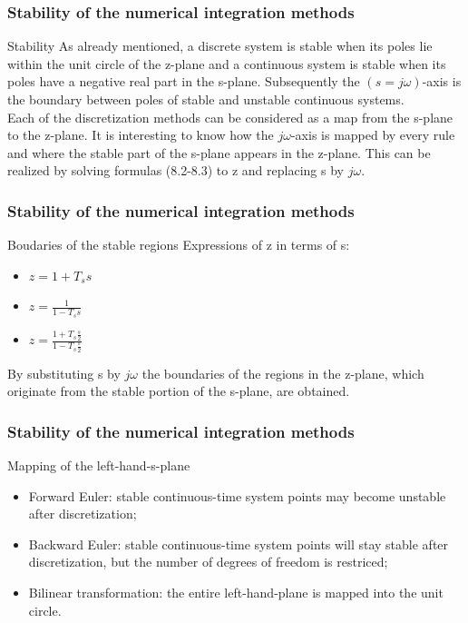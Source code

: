 \begin{frame}
	\frametitle{Stability of the numerical integration methods}
	\begin{block}{Stability}
		As already mentioned, a discrete system is stable when its poles lie within the unit circle of the z-plane and a continuous system is stable when its poles have a negative real part in the s-plane. Subsequently the $(s=j\omega)$-axis is the boundary between poles of stable and unstable continuous systems.\\
		\vspace{1em}
		Each of the discretization methods can be considered as a map from the s-plane to the z-plane. It is interesting to know how the $j\omega$-axis is mapped by every rule and where the stable part of the s-plane appears in the z-plane. This can be realized by solving formulas (8.2-8.3) to z and replacing s by $j\omega$. 
	\end{block}
\end{frame}

\begin{frame}
	\frametitle{Stability of the numerical integration methods}
	\begin{block}{Boudaries of the stable regions}
		Expressions of z in terms of s:
		\begin{itemize}
			\item $z = 1 + T_ss$
			\item $z = \frac{1}{1 - T_ss}$
			\item $z = \frac{1 + T_s\frac{s}{2}}{1 - T_s\frac{s}{2}}$
		\end{itemize}
		By substituting s by $j\omega$ the boundaries of the regions in the z-plane, which originate from the stable portion of the s-plane, are obtained.
	\end{block}
\end{frame}

\begin{frame}
	\frametitle{Stability of the numerical integration methods}
	\begin{block}{Mapping of the left-hand-s-plane}
		\begin{itemize}
			\item Forward Euler: stable continuous-time system points may become unstable after discretization;\\
			\item Backward Euler: stable continuous-time system points will stay stable after discretization, but the number of degrees of freedom is restriced;\\
			\item Bilinear transformation: the entire left-hand-plane is mapped into the unit circle.\\
		\end{itemize}
	\end{block}
\end{frame}

